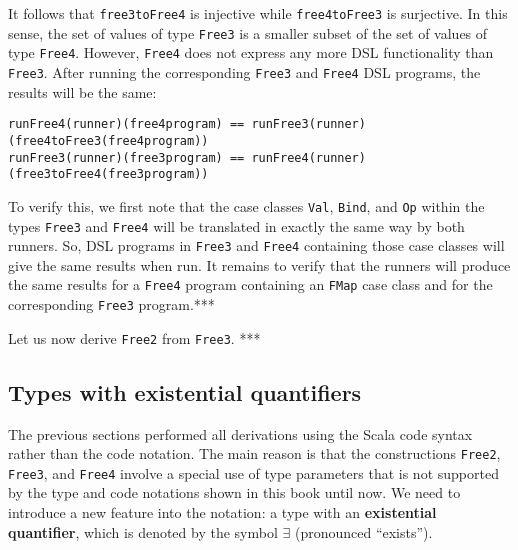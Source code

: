 It follows that \lstinline!free3toFree4!
is injective while \lstinline!free4toFree3!
is surjective. In this sense, the set of values of type \lstinline!Free3!
is a smaller subset of the set of values of type \lstinline!Free4!.
However, \lstinline!Free4!
does not express any more DSL functionality than \lstinline!Free3!.
After running the corresponding \lstinline!Free3!
and \lstinline!Free4! DSL
programs, the results will be the same:
\begin{lstlisting}
runFree4(runner)(free4program) == runFree3(runner)(free4toFree3(free4program))
runFree3(runner)(free3program) == runFree4(runner)(free3toFree4(free3program))
\end{lstlisting}
To verify this, we first note that the case classes \lstinline!Val!,
\lstinline!Bind!, and \lstinline!Op!
within the types \lstinline!Free3!
and \lstinline!Free4! will
be translated in exactly the same way by both runners. So, DSL programs
in \lstinline!Free3! and
\lstinline!Free4! containing
those case classes will give the same results when run. It remains
to verify that the runners will produce the same results for a \lstinline!Free4!
program containing an \lstinline!FMap!
case class and for the corresponding \lstinline!Free3!
program.{*}{*}{*}

Let us now derive \lstinline!Free2!
from \lstinline!Free3!.
{*}{*}{*}

\subsection{Types with existential quantifiers}

The previous sections performed all derivations using the Scala code
syntax rather than the code notation. The main reason is that the
constructions \lstinline!Free2!,
\lstinline!Free3!, and
\lstinline!Free4! involve
a special use of type parameters that is not supported by the type
and code notations shown in this book until now. We need to introduce
a new feature into the notation: a type with an \textbf{existential
quantifier},
which is denoted by the symbol $\exists$ (pronounced \textsf{``}exists\textsf{''}). 

